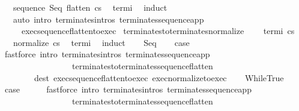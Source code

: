 \begin{isabellebody}
\ \ \ {\isachardoublequoteopen}{\isasymGamma}{\isasymturnstile}sequence\ Seq\ {\isacharparenleft}flatten\ c{\isacharparenright}{\isasymdown}s{\isachardoublequoteclose}\ \isanewline
%
\isadelimproof
%
\endisadelimproof
%
\isatagproof
{}\isamarkupfalse%
\ termi\ \isanewline
{}\isamarkupfalse%
\ {\isacharparenleft}induct{\isacharparenright}\isanewline
\ \ \ {\isacharparenleft}auto\ intro{\isacharcolon}\ terminates{\isachardot}intros\ terminates{\isacharunderscore}sequence{\isacharunderscore}app\ \isanewline
\ \ \ \ \ exec{\isacharunderscore}sequence{\isacharunderscore}flatten{\isacharunderscore}to{\isacharunderscore}exec{\isacharparenright}%
\endisatagproof
{\isafoldproof}%
%
\isadelimproof
\isanewline
%
\endisadelimproof
\isanewline
{}\isamarkupfalse%
\ terminates{\isacharunderscore}to{\isacharunderscore}terminates{\isacharunderscore}normalize{\isacharcolon}\ \isanewline
\ \ \ termi{\isacharcolon}\ {\isachardoublequoteopen}{\isasymGamma}{\isasymturnstile}c{\isasymdown}s{\isachardoublequoteclose}\ \isanewline
\ \ \ {\isachardoublequoteopen}{\isasymGamma}{\isasymturnstile}normalize\ c{\isasymdown}s{\isachardoublequoteclose}\ \isanewline
%
\isadelimproof
%
\endisadelimproof
%
\isatagproof
{}\isamarkupfalse%
\ termi\ \isanewline
{}\isamarkupfalse%
\ induct\isanewline
\ \ \isamarkupfalse%
\ Seq\isanewline
\ \ \isamarkupfalse%
\ {\isacharquery}case\isanewline
\ \ \ \ \isamarkupfalse%
\ {\isacharparenleft}fastforce\ intro{\isacharcolon}\ terminates{\isachardot}intros\ terminates{\isacharunderscore}sequence{\isacharunderscore}app\isanewline
\ \ \ \ \ \ \ \ \ \ \ \ \ \ \ \ \ terminates{\isacharunderscore}to{\isacharunderscore}terminates{\isacharunderscore}sequence{\isacharunderscore}flatten\isanewline
\ \ \ \ \ \ \ \ dest{\isacharcolon}\ exec{\isacharunderscore}sequence{\isacharunderscore}flatten{\isacharunderscore}to{\isacharunderscore}exec\ exec{\isacharunderscore}normalize{\isacharunderscore}to{\isacharunderscore}exec{\isacharparenright}\isanewline
{}\isamarkupfalse%
\isanewline
\ \ \isamarkupfalse%
\ WhileTrue\isanewline
\ \ \isamarkupfalse%
\ {\isacharquery}case\isanewline
\ \ \ \ \isamarkupfalse%
\ {\isacharparenleft}fastforce\ intro{\isacharcolon}\ terminates{\isachardot}intros\ terminates{\isacharunderscore}sequence{\isacharunderscore}app\isanewline
\ \ \ \ \ \ \ \ \ \ \ \ \ \ \ \ \ terminates{\isacharunderscore}to{\isacharunderscore}terminates{\isacharunderscore}sequence{\isacharunderscore}flatten\isanewline

\end{isabellebody}
